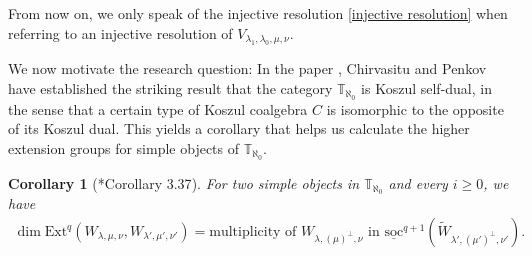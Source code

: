 \documentclass[openany, a4paper]{amsbook}
\newtheorem{prop}[thm]{Proposition}
\newtheorem{cor}[thm]{Corollary}
\theoremstyle{definition}
\numberwithin{equation}{chapter}
\newcommand{\T}[1]{{\mathbb{T}}_{\aleph_{#1}}}
\newcommand{\socl}[2]{\underline{\mathrm{soc}}^{#1}({#2})}
\newcommand{\Ext}[4]{\mathrm{Ext}^{#1}_{#2}({#3}, {#4})}
\begin{document}
From now on, we only speak of the injective resolution \eqref{injective resolution} when referring to an injective resolution of $V_{\lambda_1, \lambda_0, \mu, \nu}$. 


We now motivate the research question: In the paper \cite{cp17}, Chirvasitu and Penkov have established the striking result that the category $\T{0}$ is Koszul self-dual, in the sense that a certain type of Koszul coalgebra $C$ is isomorphic to the opposite of its Koszul dual. This yields a corollary that helps us calculate the higher extension groups for simple objects of $\T{0}$.

\begin{cor}[\cite{cp17}*{Corollary 3.37}] \label{Ext soc}
    For two simple objects in $\T{0}$ and every $i \geq 0$, we have
    \begin{align}
        \dim \Ext{q}{}{W_{\lambda, \mu, \nu}}{W_{\lambda', \mu', \nu'}} = \text{multiplicity of } W_{\lambda, (\mu)^\perp, \nu} \text{ in } \socl{q+1}{\tilde{W}_{\lambda', (\mu')^\perp, \nu'}}.
    \end{align}
\end{cor}
\end{document}

